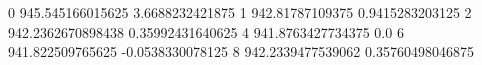 0 945.545166015625 3.6688232421875
1 942.81787109375 0.9415283203125
2 942.2362670898438 0.35992431640625
4 941.8763427734375 0.0
6 941.822509765625 -0.0538330078125
8 942.2339477539062 0.35760498046875
